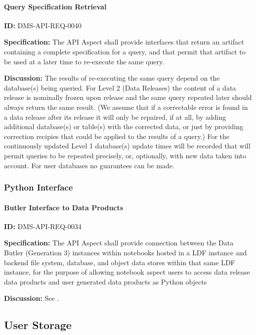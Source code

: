 \documentclass[SE,toc,lsstdraft]{lsstdoc}
\begin{document}
\paragraph{Query Specification Retrieval}\hfill  %

\label{DMS-API-REQ-0040}
\textbf{ID:} DMS-API-REQ-0040

\textbf{Specification:}
The API Aspect shall provide interfaces that return an artifact containing a complete specification for a query, and that permit that artifact to be used at a later time to re-execute the same query.

\textbf{Discussion:}
The results of re-executing the same query depend on the database(s) being queried.  For Level 2 (Data Releases) the content of a data release is nominally frozen upon release and the same query repeated later should always return the same result.  (We assume that if a correctable error is found in a data release after its release it will only be repaired, if at all, by adding additional database(s) or table(s) with the corrected data, or just by providing correction recipies that could be applied to the results of a query.)
For the continuously updated Level 1 database(s) update times will be recorded that will permit queries to be repeated precisely, or, optionally, with new data taken into account.
For user databases no guarantees can be made.

\subsubsection{Python Interface}

\paragraph{Butler Interface to Data Products}\hfill  %

\label{DMS-API-REQ-0034}
\textbf{ID:} DMS-API-REQ-0034

\textbf{Specification:}
The API Aspect shall provide connection between the Data Butler (Generation 3) instances within notebooks hosted in a LDF instance and backend file system, database, and object data stores within that same LDF instance, for the purpose of allowing notebook aspect users to access data release data products and user generated data products as Python objects

\textbf{Discussion:}
See .

\subsection{User Storage}
\end{document}
